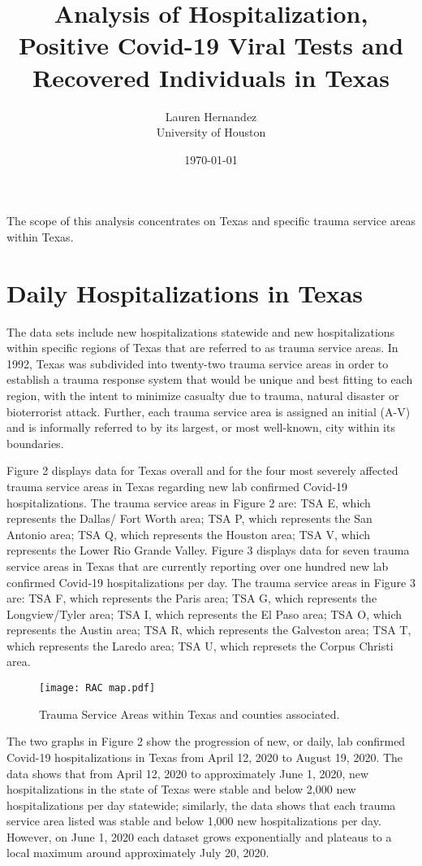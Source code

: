 \documentclass{article}
\title{Analysis of Hospitalization, Positive Covid-19 Viral Tests and Recovered Individuals in Texas}
\author{Lauren Hernandez  \\
	University of Houston  \\}
\date{\today}
\begin{document}
\maketitle
The scope of this analysis concentrates on Texas and specific trauma service areas within Texas.


\section{Daily Hospitalizations in Texas}

The data sets include new hospitalizations statewide and new hospitalizations within specific regions of Texas that are referred to as trauma service areas. In 1992, Texas was subdivided into twenty-two trauma service areas in order to establish a trauma response system that would be unique and best fitting to each region, with the intent to minimize casualty due to trauma, natural disaster or bioterrorist attack. Further, each trauma service area is assigned an initial (A-V) and is informally referred to by its largest, or most well-known, city within its boundaries. 

\vspace{2mm}

Figure 2 displays data for Texas overall and for the four most severely affected trauma service areas in Texas regarding new lab confirmed Covid-19 hospitalizations. The trauma service areas in Figure 2 are: TSA E, which represents the Dallas/ Fort Worth area; TSA P, which represents the San Antonio area; TSA Q, which represents the Houston area; TSA V, which represents the Lower Rio Grande Valley.  Figure 3 displays data for seven trauma service areas in Texas that are currently reporting over one hundred new lab confirmed Covid-19 hospitalizations per day. The trauma service areas in Figure 3 are: TSA F, which represents the Paris area; TSA G, which represents the Longview/Tyler area; TSA I, which represents the El Paso area; TSA O, which represents the Austin area; TSA R, which represents the Galveston area; TSA T, which represents the  Laredo area; TSA U, which represets the Corpus Christi area. 

\vspace{1cm}
\begin{figure}[!htbp]
	\centering
	\texttt{[image: RAC map.pdf]}
	\caption{\footnotesize{Trauma Service Areas within Texas and counties associated.} }
\end{figure}		
	\FloatBarrier

The two graphs in Figure 2 show the progression of new, or daily, lab confirmed Covid-19 hospitalizations in Texas from April 12, 2020 to August 19, 2020. The data shows that from April 12, 2020 to approximately June 1, 2020, new hospitalizations in the state of Texas were stable and below 2,000 new hospitalizations per day statewide; similarly, the data shows that each trauma service area listed was stable and below 1,000 new hospitalizations per day. However, on June 1, 2020 each dataset grows exponentially and plateaus to a local maximum around approximately July 20, 2020. 
\end{document}
